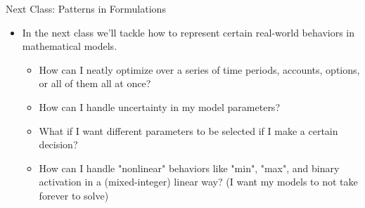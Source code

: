 \documentclass[10pt, aspectratio=169]{beamer}
\begin{document}
\begin{frame}{Next Class: Patterns in Formulations}
    \begin{itemize}
        \item In the next class we'll tackle how to represent certain real-world behaviors in mathematical models.
        \begin{itemize}
            \item How can I neatly optimize over a series of time periods, accounts, options, or all of them all at once?
            \item How can I handle uncertainty in my model parameters?
            \item What if I want different parameters to be selected if I make a certain decision?
            \item How can I handle "nonlinear" behaviors like "min", "max", and binary activation in a (mixed-integer) linear way? (I want my models to not take forever to solve)
        \end{itemize}
    \end{itemize}
\end{frame}
\end{document}
